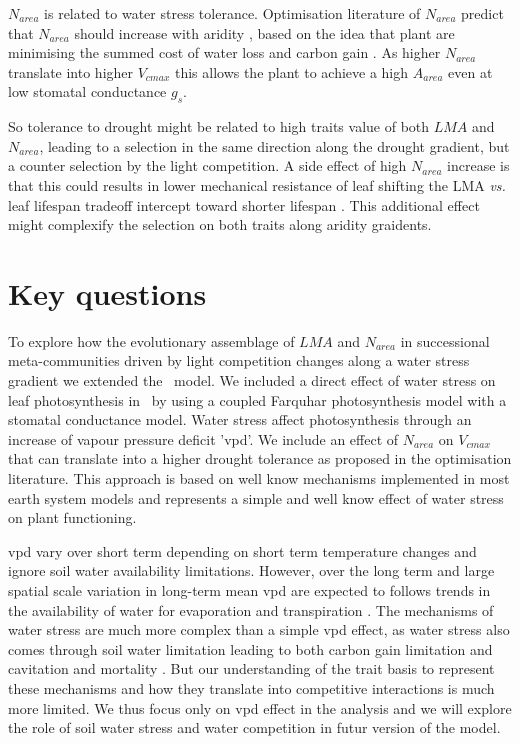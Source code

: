 \documentclass[a4paper,11pt]{article}
\begin{document}
$N_{area}$ is related to water stress tolerance. Optimisation literature of $N_{area}$ predict that $N_{area}$ should
increase with aridity \citep{Wright-2003}, based on the idea that plant are minimising the summed cost of water
loss and carbon gain
\citep{Medlyn-2002,Wright-2003,Prentice-2014,Lu-2016,Wang-2017,Dong-2017}. As
higher $N_{area}$ translate into higher $V_{cmax}$ this allows the
plant to achieve a high $A_{area}$ even at low stomatal conductance
$g_s$.

So tolerance to drought might be related to high traits value of both
$LMA$ and $N_{area}$, leading to a selection in the same direction
along the drought gradient, but a counter selection by the light
competition.
A side effect of high $N_{area}$
increase is that this could results in lower mechanical
resistance of leaf shifting the LMA \textit{vs.} leaf
lifespan tradeoff intercept toward shorter lifespan
\citep{Wright-2002a}. This additional effect might complexify the
selection on both traits along aridity graidents.


\section{Key questions}

To explore how the evolutionary
assemblage of $LMA$ and $N_{area}$ in successional meta-communities
driven by light competition changes along a water stress gradient we
extended the \plant\ model. We included a direct effect of water
stress on leaf photosynthesis in \plant\ by using a coupled Farquhar
photosynthesis model with a stomatal conductance model. Water stress
affect photosynthesis through an increase of vapour pressure deficit
'vpd'. We include an effect of $N_{area}$ on $V_{cmax}$ that can
translate into a higher drought tolerance as proposed in the
optimisation literature. This approach
is based on well know mechanisms implemented in most earth system models \citep{Rogers-2017}
and represents a simple and well know effect of water stress on plant
functioning.

vpd vary over short term depending on short term
temperature changes and ignore soil water availability
limitations. However, over the long term and large spatial scale
variation in long-term mean vpd are expected to follows trends in the
availability of water for evaporation and transpiration
\citep{Prentice-2014}. The mechanisms of water stress are much more complex than a simple vpd
effect, as water stress also comes through soil water limitation leading to
both carbon gain limitation and cavitation and mortality
\citep{Sperry-2016,Wolf-2016,Sperry-2017}. But our understanding of
the trait basis to represent these mechanisms and how they translate
into competitive interactions is much more limited. We thus focus only
on vpd effect in the analysis and we will explore the role of soil water stress and water competition in futur version of the model.
\end{document}
